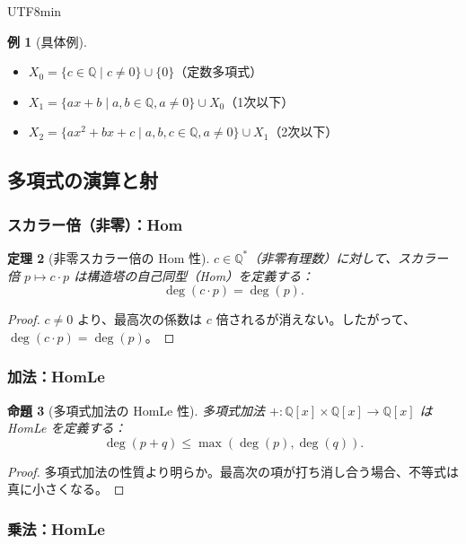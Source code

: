 \documentclass[12pt,a4paper]{article}
\newtheorem{theorem}{定理}[section]
\newtheorem{proposition}[theorem]{命題}
\theoremstyle{definition}
\newtheorem{example}[theorem]{例}
\theoremstyle{remark}
\newcommand{\Q}{\mathbb{Q}}
\begin{document}
\begin{CJK}{UTF8}{min}
\begin{example}[具体例]
\begin{itemize}
\item $X_0 = \{c \in \Q \mid c \neq 0\} \cup \{0\}$（定数多項式）
\item $X_1 = \{ax + b \mid a, b \in \Q, a \neq 0\} \cup X_0$（1次以下）
\item $X_2 = \{ax^2 + bx + c \mid a, b, c \in \Q, a \neq 0\} \cup X_1$（2次以下）
\end{itemize}
\end{example}

\subsection{多項式の演算と射}

\subsubsection{スカラー倍（非零）：Hom}

\begin{theorem}[非零スカラー倍の Hom 性]
$c \in \Q^*$（非零有理数）に対して、スカラー倍 $p \mapsto c \cdot p$ は構造塔の自己同型（Hom）を定義する：
$$\deg(c \cdot p) = \deg(p).$$
\end{theorem}

\begin{proof}
$c \neq 0$ より、最高次の係数は $c$ 倍されるが消えない。したがって、$\deg(c \cdot p) = \deg(p)$。
\end{proof}

\subsubsection{加法：HomLe}

\begin{proposition}[多項式加法の HomLe 性]
多項式加法 $+: \Q[x] \times \Q[x] \to \Q[x]$ は HomLe を定義する：
$$\deg(p + q) \leq \max(\deg(p), \deg(q)).$$
\end{proposition}

\begin{proof}
多項式加法の性質より明らか。最高次の項が打ち消し合う場合、不等式は真に小さくなる。
\end{proof}

\subsubsection{乗法：HomLe}


\end{CJK}
\end{document}
